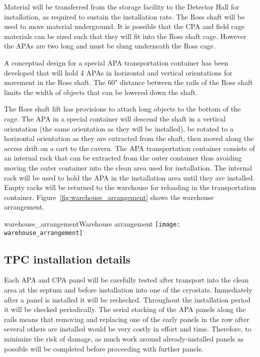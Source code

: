 Material will be transferred from the storage facility to the Detector Hall for installation, as required to sustain the installation rate. The Ross shaft will be used to move material underground. It is possible that the CPA and field cage 
materials can be sized such that they will fit into the Ross shaft cage. However the APAs are two long and must be slung underneath the Ross cage. 

A conceptual design for a special APA transportation container has been developed that will hold 4 APAs in horizontal and vertical orientations for movement in the Ross shaft. The 60" distance between the rails of the 
Ross shaft limits the width of objects that can be lowered down the shaft. 

The Ross shaft lift has provisions to attach long objects to the bottom of the cage. The APA in a special container will descend the shaft in a vertical orientation 
(the same orientation as they will be installed), be rotated to a horizontal orientation as they are extracted from the shaft, then moved along the access drift on a cart to the cavern. The APA transportation container consists of 
an internal rack that can be extracted from the outer container thus avoiding moving the outer container into the clean area used for installation. The internal rack will be used to hold the APA in the installation area until they 
are installed. Empty racks will be returned to the warehouse for reloading in the transportation container. Figure~\ref{fig:warehouse_arrangement} shows the warehouse arrangement.

\begin{cdrfigure}{warehouse_arrangement}{Warehouse arrangement}
\texttt{[image: warehouse\_arrangement]}
\end{cdrfigure}



\subsection{TPC installation details}

\label{fd:install:fsinstall:tpc:install:steps}

Each APA and CPA panel will be carefully tested after transport into the clean area at the septum and before installation into one of the cryostats. Immediately after a panel is installed it will be rechecked. Throughout the 
installation period it will be checked periodically. The serial stacking of the APA panels along the rails means that removing and replacing one of the early panels in the row after several others are installed would be 
very costly in effort and time. Therefore, to minimize the risk of damage, as much work around already-installed panels as possible will be completed before proceeding with further panels. 

